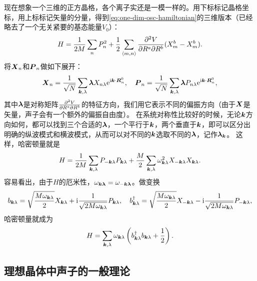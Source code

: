 \documentclass[hyperref, UTF8, a4paper]{ctexart}
\newcommand*{\ii}{\mathrm{i}}
\newcommand*{\ee}{\mathrm{e}}
\newcommand*{\pair}[1]{\langle #1 \rangle}
\begin{document}
现在想象一个三维的正方晶格，各个离子实还是一模一样的。用下标标记晶格坐标，用上标标记矢量的分量，得到\eqref{eq:one-dim-osc-hamiltonian}的三维版本（已经略去了一个无关紧要的基态能量$V_0$）：
\begin{equation}
    {H} = \frac{1}{2 M} \sum_n {P}_n^2 + \frac{1}{2} \sum_{\pair{m, n}} \pdv{V}{R^a}{R^b} (X_m^a - X_n^a) (X_m^b - X_m^b).
\end{equation}
将$\vb*{X}_n$和$\vb*{P}_n$做如下展开：
\begin{equation}
    \vb*{X}_n = \frac{1}{\sqrt{N}} \sum_{\vb*{k}, \lambda} \vb*{\lambda} X_{n \lambda} \ee^{\ii \vb*{k} \cdot \vb*{R}_n^0}, \quad \vb*{P}_n = \frac{1}{\sqrt{N}} \sum_{\vb*{k}, \lambda} \vb*{\lambda} P_{n \lambda} \ee^{\ii \vb*{k} \cdot \vb*{R}_n^0},
\end{equation}
其中$\vb*{\lambda}$是对称矩阵$\pdv{V}{R^a}{R^b}$的特征方向，我们用它表示不同的偏振方向（由于$\vb*{X}$是矢量，声子会有一个额外的偏振自由度）。
在系统对称性比较好的时候，无论$\vb*{k}$方向如何，都可以找到三个合适的$\vb*{\lambda}$，一个平行于$\vb*{k}$，两个垂直于$\vb*{k}$，即可以区分出明确的纵波模式和横波模式，从而可以对不同的$\vb*{k}$选取不同的$\vb*{\lambda}$，记作$\vb*{\lambda}_{\vb*{k}}$。
这样，哈密顿量就是
\begin{equation}
    {H} = \frac{1}{2 M} \sum_{\vb*{k}, \lambda} {P}_{-\vb*{k} \lambda} {P}_{\vb*{k}\lambda} + \frac{M}{2} \sum_{\vb*{k}, \lambda} \omega_{\vb*{k} \lambda}^2 {X}_{-\vb*{k} \lambda} {X}_{\vb*{k} \lambda}.
\end{equation}
容易看出，由于${H}$的厄米性，$\omega_{\vb*{k}\vb*{\lambda}} = \omega_{-\vb*{k} \vb*{\lambda}}$。做变换
\begin{equation}
    {b}_{\vb*{k} \lambda} = \sqrt{\frac{M \omega_{\vb*{k} \lambda}}{2}} {X}_{\vb*{k} \lambda} + \ii \frac{1}{\sqrt{2 M \omega_{\vb*{k} \lambda}}} P_{\vb*{k} \lambda}, \quad {b}^\dagger_{\vb*{k} \lambda} = \sqrt{\frac{M \omega_{\vb*{k} \lambda}}{2}} {X}_{- \vb*{k} \lambda} - \ii \frac{1}{\sqrt{2 M \omega_{\vb*{k} \lambda}}} P_{- \vb*{k} \lambda},
    \label{eq:transform-b-pq}
\end{equation}
哈密顿量就成为
\begin{equation}
    {H} = \sum_{\vb*{k}, \lambda} \omega_{\vb*{k} \lambda} \left( {b}^\dagger_{\vb*{k} \lambda} {b}_{\vb*{k} \lambda} + \frac{1}{2} \right).
\end{equation}

\subsection{理想晶体中声子的一般理论}
\end{document}
